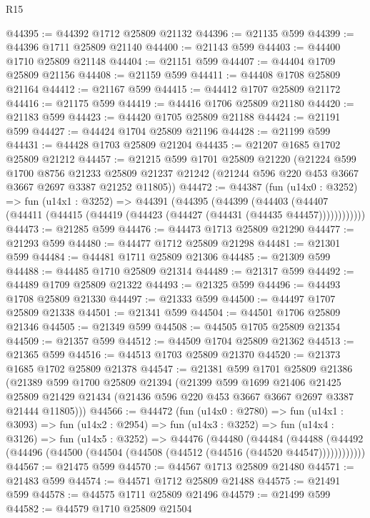 \begin{lexlean}{R15}
\begin{coremodule}
@44395 := @44392 @1712 @25809 @21132
@44396 := @21135 @599
@44399 := @44396 @1711 @25809 @21140
@44400 := @21143 @599
@44403 := @44400 @1710 @25809 @21148
@44404 := @21151 @599
@44407 := @44404 @1709 @25809 @21156
@44408 := @21159 @599
@44411 := @44408 @1708 @25809 @21164
@44412 := @21167 @599
@44415 := @44412 @1707 @25809 @21172
@44416 := @21175 @599
@44419 := @44416 @1706 @25809 @21180
@44420 := @21183 @599
@44423 := @44420 @1705 @25809 @21188
@44424 := @21191 @599
@44427 := @44424 @1704 @25809 @21196
@44428 := @21199 @599
@44431 := @44428 @1703 @25809 @21204
@44435 := @21207 @1685 @1702 @25809 @21212
@44457 := @21215
    @599
    @1701
    @25809
    @21220
    (@21224
      @599
      @1700
      @8756
      @21233
      @25809
      @21237
      @21242
      (@21244 @596 @220 @453 @3667 @3667 @2697 @3387 @21252 @11805))
@44472 := @44387
    (fun (u14x0 : @3252) =>
    fun (u14x1 : @3252) =>
    @44391
      (@44395
        (@44399
          (@44403 (@44407 (@44411 (@44415 (@44419 (@44423 (@44427 (@44431 (@44435 @44457))))))))))))
@44473 := @21285 @599
@44476 := @44473 @1713 @25809 @21290
@44477 := @21293 @599
@44480 := @44477 @1712 @25809 @21298
@44481 := @21301 @599
@44484 := @44481 @1711 @25809 @21306
@44485 := @21309 @599
@44488 := @44485 @1710 @25809 @21314
@44489 := @21317 @599
@44492 := @44489 @1709 @25809 @21322
@44493 := @21325 @599
@44496 := @44493 @1708 @25809 @21330
@44497 := @21333 @599
@44500 := @44497 @1707 @25809 @21338
@44501 := @21341 @599
@44504 := @44501 @1706 @25809 @21346
@44505 := @21349 @599
@44508 := @44505 @1705 @25809 @21354
@44509 := @21357 @599
@44512 := @44509 @1704 @25809 @21362
@44513 := @21365 @599
@44516 := @44513 @1703 @25809 @21370
@44520 := @21373 @1685 @1702 @25809 @21378
@44547 := @21381
    @599
    @1701
    @25809
    @21386
    (@21389
      @599
      @1700
      @25809
      @21394
      (@21399
        @599
        @1699
        @21406
        @21425
        @25809
        @21429
        @21434
        (@21436 @596 @220 @453 @3667 @3667 @2697 @3387 @21444 @11805)))
@44566 := @44472
    (fun (u14x0 : @2780) =>
    fun (u14x1 : @3093) =>
    fun (u14x2 : @2954) =>
    fun (u14x3 : @3252) =>
    fun (u14x4 : @3126) =>
    fun (u14x5 : @3252) =>
    @44476
      (@44480
        (@44484
          (@44488 (@44492 (@44496 (@44500 (@44504 (@44508 (@44512 (@44516 (@44520 @44547))))))))))))
@44567 := @21475 @599
@44570 := @44567 @1713 @25809 @21480
@44571 := @21483 @599
@44574 := @44571 @1712 @25809 @21488
@44575 := @21491 @599
@44578 := @44575 @1711 @25809 @21496
@44579 := @21499 @599
@44582 := @44579 @1710 @25809 @21504

\end{coremodule}
\end{lexlean}
